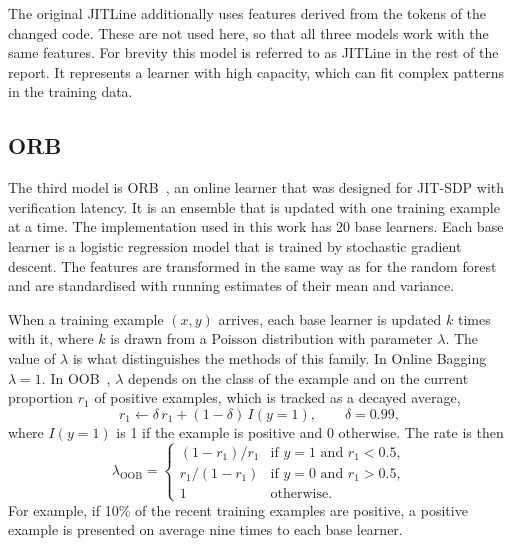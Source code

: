 \documentclass[12pt,a4paper,oneside]{report}
\begin{document}
The original JITLine additionally uses features derived from the tokens of
the changed code. These are not used here, so that all three models work with
the same features. For brevity this model is referred to as JITLine in the
rest of the report. It represents a learner with high capacity, which can fit
complex patterns in the training data.

\subsection{ORB}

The third model is ORB~\cite{cabral2019orb}, an online learner that was
designed for JIT-SDP with verification latency. It is an ensemble that is
updated with one training example at a time. The implementation used in this
work has 20 base learners. Each base learner is a logistic regression model
that is trained by stochastic gradient descent. The features are transformed
in the same way as for the random forest and are standardised with running
estimates of their mean and variance.

When a training example $(x, y)$ arrives, each base learner is updated $k$
times with it, where $k$ is drawn from a Poisson distribution with parameter
$\lambda$. The value of $\lambda$ is what distinguishes the methods of this
family. In Online Bagging $\lambda = 1$. In OOB~\cite{wang2015oob}, $\lambda$
depends on the class of the example and on the current proportion $r_1$ of
positive examples, which is tracked as a decayed average,
\begin{equation}
r_1 \leftarrow \delta\, r_1 + (1-\delta)\,I(y=1), \qquad \delta = 0.99,
\end{equation}
where $I(y=1)$ is 1 if the example is positive and 0 otherwise. The rate is
then
\begin{equation}
\lambda_{\mathrm{OOB}} =
\begin{cases}
(1-r_1)/r_1 & \text{if } y=1 \text{ and } r_1 < 0.5,\\
r_1/(1-r_1) & \text{if } y=0 \text{ and } r_1 > 0.5,\\
1 & \text{otherwise.}
\end{cases}
\label{eq:oob}
\end{equation}
For example, if 10\% of the recent training examples are positive, a positive
example is presented on average nine times to each base learner.
\end{document}
